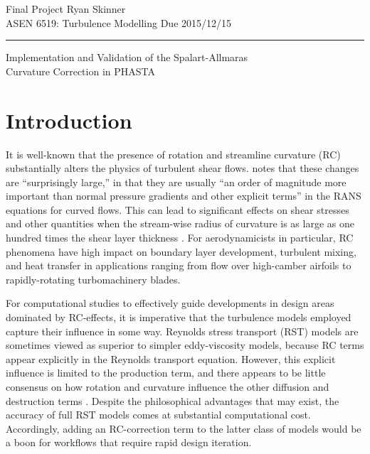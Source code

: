 \documentclass[11pt]{article}
\begin{document}
\pagestyle{fancyplain}
\lhead{}
\chead{}
\rhead{}
\cfoot{\hrule \thepage}

\noindent
{\Large Final Project}
\hfill
{\large Ryan Skinner}
\\[0.5ex]
{\large ASEN 6519: Turbulence Modelling}
\hfill
{\large Due 2015/12/15}\\
\hrule
\vspace{6pt}

\vspace{0.5in}
\begin{center}
\LARGE Implementation and Validation of the Spalart-Allmaras \\ Curvature Correction in PHASTA
\end{center}
\vspace{0.2in}

\section{Introduction} %

It is well-known that the presence of rotation and streamline curvature (RC) substantially alters the physics of turbulent shear flows. \citet{bradshaw1973} notes that these changes are ``surprisingly large,'' in that they are usually ``an order of magnitude more important than normal pressure gradients and other explicit terms'' in the RANS equations for curved flows. This can lead to significant effects on shear stresses and other quantities when the stream-wise radius of curvature is as large as one hundred times the shear layer thickness \citep{bradshaw1973}. For aerodynamicists in particular, RC phenomena have high impact on boundary layer development, turbulent mixing, and heat transfer in applications ranging from flow over high-camber airfoils to rapidly-rotating turbomachinery blades.

For computational studies to effectively guide developments in design areas dominated by RC-effects, it is imperative that the turbulence models employed capture their influence in some way. Reynolds stress transport (RST) models are sometimes viewed as superior to simpler eddy-viscosity models, because RC terms appear explicitly in the Reynolds transport equation. However, this explicit influence is limited to the production term, and there appears to be little consensus on how rotation and curvature influence the other diffusion and destruction terms \citep{spalart1997}. Despite the philosophical advantages that may exist, the accuracy of full RST models comes at substantial computational cost. Accordingly, adding an RC-correction term to the latter class of models would be a boon for workflows that require rapid design iteration.
\end{document}
